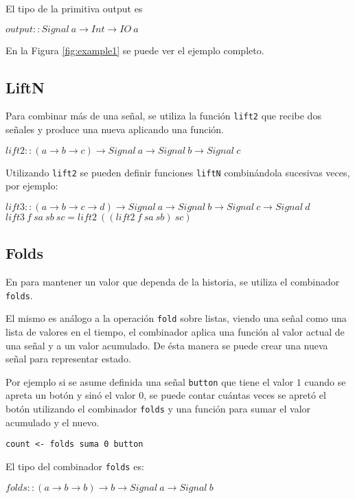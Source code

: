   El tipo de la primitiva output es

\begin{center}
$output :: Signal\ a \rightarrow Int \rightarrow IO\ a$
\end{center}
 
  En la Figura \ref{fig:example1} se puede ver el ejemplo completo.



\subsection{LiftN}

  Para combinar más de una señal, se utiliza la función \texttt{lift2}
que recibe dos señales y produce una nueva aplicando una función.

\begin{center}
$lift2 :: (a \rightarrow b \rightarrow c) \rightarrow Signal\ a \rightarrow Signal\ b \rightarrow Signal\ c$
\end{center}

  Utilizando \texttt{lift2} se pueden definir funciones \texttt{liftN}
combinándola sucesivas veces, por ejemplo:

\begin{center}
$lift3 :: (a \rightarrow b \rightarrow c \rightarrow d) \rightarrow Signal\ a \rightarrow Signal\ b \rightarrow Signal\ c \rightarrow Signal\ d$
$lift3\ f\ sa\ sb\ sc = lift2\ ((lift2\ f\ sa\ sb)\ sc)$
\end{center}

\subsection{Folds}

  En \frob{} para mantener un valor que dependa de la historia, se utiliza
el combinador \texttt{folds}.

  El mismo es análogo a la operación \texttt{fold} sobre listas, viendo
una señal como una lista de valores en el tiempo, el combinador aplica una
función al valor actual de una señal y a un valor acumulado.
  De ésta manera se puede crear una nueva señal para representar estado.

  Por ejemplo si se asume definida una señal \texttt{button} que tiene
el valor $1$ cuando se apreta un botón y sinó el valor $0$, se puede
contar cuántas veces se apretó el botón utilizando el combinador \texttt{folds}
y una función para sumar el valor acumulado y el nuevo.

\begin{center}
\begin{Verbatim}[frame=single]
count <- folds suma 0 button
\end{Verbatim}
\end{center}

El tipo del combinador \texttt{folds} es:

\begin{center}
$folds :: (a \rightarrow b \rightarrow b) \rightarrow b \rightarrow Signal\ a \rightarrow Signal\ b$
\end{center}


